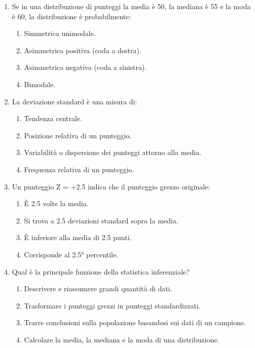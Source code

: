 \documentclass[12pt, a4paper]{article}
\begin{document}
\begin{enumerate}[resume]
    \item Se in una distribuzione di punteggi la media è 50, la mediana è 55 e la moda è 60, la distribuzione è probabilmente:
    \begin{enumerate}
        \item Simmetrica unimodale.
        \item Asimmetrica positiva (coda a destra).
        \item Asimmetrica negativa (coda a sinistra).
        \item Bimodale.
    \end{enumerate}
    \vspace{0.3cm}

    \item La deviazione standard è una misura di:
    \begin{enumerate}
        \item Tendenza centrale.
        \item Posizione relativa di un punteggio.
        \item Variabilità o dispersione dei punteggi attorno alla media.
        \item Frequenza relativa di un punteggio.
    \end{enumerate}
    \vspace{0.3cm}

    \item Un punteggio Z = +2.5 indica che il punteggio grezzo originale:
    \begin{enumerate}
        \item È 2.5 volte la media.
        \item Si trova a 2.5 deviazioni standard sopra la media.
        \item È inferiore alla media di 2.5 punti.
        \item Corrisponde al 2.5° percentile.
    \end{enumerate}
    \vspace{0.3cm}

    \item Qual è la principale funzione della statistica inferenziale?
    \begin{enumerate}
        \item Descrivere e riassumere grandi quantità di dati.
        \item Trasformare i punteggi grezzi in punteggi standardizzati.
        \item Trarre conclusioni sulla popolazione basandosi sui dati di un campione.
        \item Calcolare la media, la mediana e la moda di una distribuzione.
    \end{enumerate}
    \vspace{0.3cm}


\end{enumerate}
\end{document}
